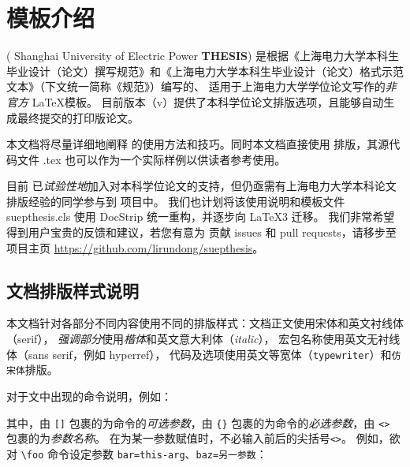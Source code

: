 \chapter{模板介绍}
\suepthesis{} ( Shanghai University of Electric Power \textbf{THESIS}) 
是根据《上海电力大学本科生毕业设计（论文）撰写规范》和《上海电力大学本科生毕业设计（论文）格式示范文本》（下文统一简称《规范》）编写的、
适用于上海电力大学学位论文写作的\emph{非官方} \LaTeX 模板。
目前版本（v\version{}）提供了本科学位论文排版选项，且能够自动生成最终提交的打印版论文。

本文档将尽量详细地阐释 \suepthesis{} 的使用方法和技巧。同时本文档直接使用 \suepthesis{} 排版，其源代码文件 \main.tex 也可以作为一个实际样例以供读者参考使用。

目前 \suepthesis{} 已\emph{试验性地}加入对本科学位论文的支持，但仍亟需有上海电力大学本科论文排版经验的同学参与到 \suepthesis{} 项目中。
我们也计划将该使用说明和模板文件 suepthesis.cls 使用 \textsf{DocStrip} 统一重构，并逐步向 \LaTeX3 迁移。
我们非常希望得到用户宝贵的反馈和建议，若您有意为 \suepthesis{} 贡献 issues 和 pull requests，请移步至项目主页 \url{https://github.com/lirundong/suepthesis}。

\section*{文档排版样式说明}
本文档针对各部分不同内容使用不同的排版样式：文档正文使用宋体和英文衬线体（serif），
\emph{强调部分}使用\emph{楷体}和英文意大利体（\emph{italic}），
宏包名称使用英文无衬线体（\textsf{sans serif}，例如 \textsf{hyperref}），
代码及选项使用英文等宽体（\texttt{typewriter}）和\texttt{仿宋体}排版。

对于文中出现的命令说明，例如：
\begin{latex}
\end{latex}
其中，由 \verb|[]| 包裹的为命令的\emph{可选参数}，由 \verb|{}| 包裹的为命令的\emph{必选参数}，由 \verb|<>| 包裹的为\emph{参数名称}。
在为某一参数赋值时，不必输入前后的尖括号\verb|<>|。
例如，欲对 \verb|\foo| 命令设定参数 \verb|bar=this-arg|、\verb|baz=另一参数|：
\begin{latex}
\end{latex}